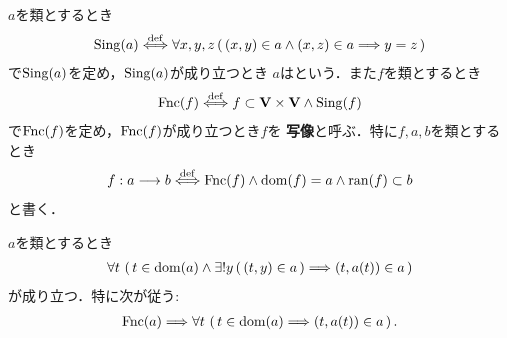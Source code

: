 	\begin{screen}
		\begin{dfn}[写像]
			$a$を類とするとき
			\begin{align}
				\operatorname*{Sing}(a) \overset{\mathrm{def}}{\Longleftrightarrow}
				\forall x,y,z\, (\, (x,y) \in a \wedge (x,z) \in a
				\Longrightarrow y=z\, )
			\end{align}
			で$\operatorname*{Sing}(a)$を定め，$\operatorname*{Sing}(a)$が成り立つとき
			$a$はという．また$f$を類とするとき
			\begin{align}
				\operatorname*{Fnc}(f) \overset{\mathrm{def}}{\Longleftrightarrow}
				f \subset \mathbf{V} \times \mathbf{V} \wedge \operatorname*{Sing}(f)
			\end{align}
			で$\operatorname*{Fnc}(f)$を定め，$\operatorname*{Fnc}(f)$が成り立つとき$f$を
			{\bf 写像}と呼ぶ．特に$f,a,b$を類とするとき
			\begin{align}
				f:a \longrightarrow b \overset{\mathrm{def}}{\Longleftrightarrow}
				\operatorname*{Fnc}(f) \wedge \operatorname*{dom}(f) = a \wedge \operatorname*{ran}(f) \subset b
			\end{align}
			と書く．
		\end{dfn}
	\end{screen}
	
	\begin{screen}
		\begin{thm}[写像の値は順序対になったときに写像に属する]\label{thm:value_of_a_mapping}
			$a$を類とするとき
			\begin{align}
				\forall t\, \left(\, t \in \operatorname*{dom}(a) \wedge \exists ! y\, (\, (t,y) \in a\, ) \Longrightarrow (t,a(t)) \in a\, \right)
			\end{align}
			が成り立つ．特に次が従う:
			\begin{align}
				\operatorname*{Fnc}(a) \Longrightarrow \forall t\, \left(\, t \in \operatorname*{dom}(a) \Longrightarrow (t,a(t)) \in a\, \right).
				\label{eq:thm_value_of_a_mapping_2}
			\end{align}
		\end{thm}
	\end{screen}
	
